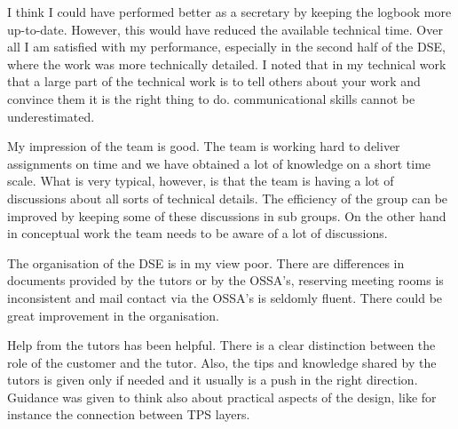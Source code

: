 I think I could have performed better as a secretary by keeping the logbook more up-to-date. However, this would have reduced the available technical time. Over all I am satisfied with my performance, especially in the second half of the DSE, where the work was more technically detailed. I noted that in my technical work that a large part of the technical work is to tell others about your work and convince them it is the right thing to do. communicational skills cannot be underestimated.

My impression of the team is good. The team is working hard to deliver assignments on time and we have obtained a lot of knowledge on a short time scale. What is very typical, however, is that the team is having a lot of discussions about all sorts of technical details. The efficiency of the group can be improved by keeping some of these discussions in sub groups. On the other hand in conceptual work the team needs to be aware of a lot of discussions.

The organisation of the DSE is in my view poor. There are differences in documents provided by the tutors or by the OSSA's, reserving meeting rooms is inconsistent and mail contact via the OSSA's is seldomly fluent. There could be great improvement in the organisation.

Help from the tutors has been helpful. There is a clear distinction between the role of the customer and the tutor. Also, the tips and knowledge shared by the tutors is given only if needed and it usually is a push in the right direction. Guidance was given to think also about practical aspects of the design, like for instance the connection between TPS layers.
